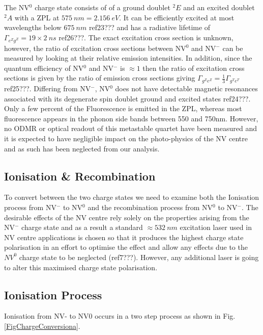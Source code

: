 \documentclass[,prl,twocolumn]{revtex4}
\begin{document}
The NV$^0$ charge state consists of of a ground doublet $^2E$ and an excited doublet $^2A$ with a ZPL at $\SI{575}{nm} = \SI{2.156}{eV}$.  It can be efficiently excited at most wavelengths below $\SI{675}{nm}$ ref23??? and has a radiative lifetime of $\Gamma_{e^Zg^Z} = 19\times2 \SI{}{ns}$ ref26???. The exact excitation cross section is unknown, however, the ratio of excitation cross sections between NV$^0$ and NV$^-$ can be measured by looking at their relative emission intensities. In addition, since the quantum efficiency of NV$^0$ and NV$^-$ is $\approx 1$ then the ratio of excitation cross sections is given by the ratio of emission cross sections giving $\Gamma_{g^Ze^Z} = \frac{1}{3} \Gamma_{g^Te^T}$ ref25???. Differing from NV$^-$, NV$^0$ does not have detectable magnetic resonances associated with its degenerate spin doublet ground and excited states ref24???. Only a few percent of the Fluorescence is emitted in the ZPL, whereas most fluorescence appears in the phonon side bands between 550 and 750nm. However, no ODMR or optical readout of this metastable quartet have been measured and it is expected to have negligible impact on the photo-physics of the NV centre and as such has been neglected from our analysis. 
  

\subsection{Ionisation \& Recombination}
To convert between the two charge states we need to examine both the Ionisation process from NV$^-$ to NV$^0$ and the recombination process from NV$^0$ to NV$^-$. The desirable effects of the NV centre rely solely on the properties arising from the NV$^-$ charge state and as a result a standard $\approx \SI{532}{nm}$ excitation laser used in NV centre applications is chosen so that it produces the highest charge state polarisation in an effort to optimise the effect and allow any effects due to the $NV^0$ charge state to be neglected (ref7???). However, any additional laser is going to alter this maximised charge state polarisation. 

\subsection{Ionisation Process}
Ionisation from NV- to NV0 occurs in a two step process as shown in Fig. \ref{FigChargeConversiona}.
\end{document}
